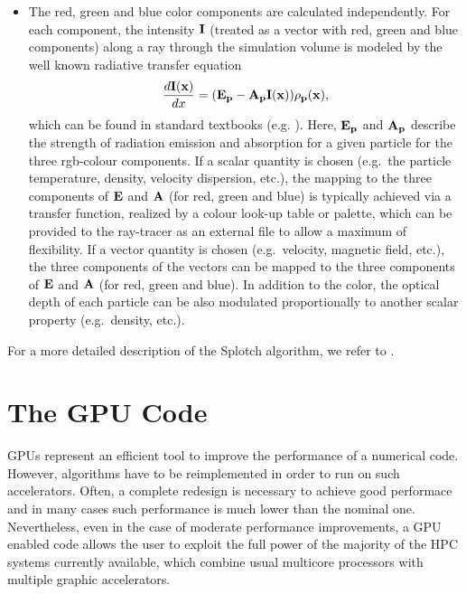 \documentclass[11pt]{article}
\begin{document}
\begin{itemize}
\item
The red, green and blue color components are calculated independently.
For each component, the intensity $\bf{I}$ (treated
as a vector with red, green and blue components) along a ray through the simulation
volume is modeled by the well known radiative transfer equation
\begin{equation}\label{rad}
\frac{d\bf{I}(x)}{dx}=(\bf{E}_p-\bf{A}_p\bf{I}(x))\rho_p(x),
\end{equation}
which can be found in standard textbooks (e.g. \cite{1991par..book.....S}).
Here, $\bf{E}_p$ and $\bf{A}_p$ describe the strength of radiation emission and absorption
for a given particle for the three rgb-colour components. 
If a scalar quantity is chosen (e.g.\ the particle temperature,
density, velocity dispersion, etc.), the mapping to the three components of $\bf{E}$ and $\bf{A}$ (for red, green and blue)
is typically achieved via a transfer function, realized by a colour look-up table or palette, which can
be provided to the ray-tracer as an external file to allow a maximum of flexibility. If a
vector quantity is chosen (e.g.\ velocity, magnetic field, etc.), the three components of the vectors
can be mapped to the three components of $\bf{E}$ and $\bf{A}$ (for red, green and blue). 
In addition
to the color, the optical depth of each particle can be also modulated proportionally to another
scalar property (e.g.\ density, etc.).
\end{itemize}

For a more detailed description of the Splotch algorithm, we refer to \cite{2008NJPh...10l5006D}.

\section{The GPU Code}
\label{sec:gpu-code}

GPUs represent an efficient tool to improve the performance of a numerical code.
However, algorithms have to be reimplemented in order to run on such accelerators. 
Often, a complete redesign is necessary to achieve good performace and in many
cases such performance is much lower than the nominal one. Nevertheless, even in 
the case of moderate performance improvements, a GPU enabled code allows the 
user to exploit the full power of the majority of the HPC systems currently 
available, which combine usual multicore processors with multiple graphic accelerators.
\end{document}
